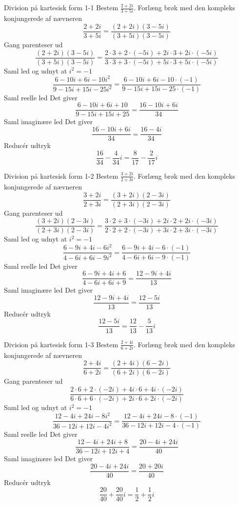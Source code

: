 \documentclass{article}
\begin{document}
\tableofcontents
\newpage
\begin{exercise}{Division på kartesisk form 1-1}
Bestem $\frac{2 + 2i}{3 + 5i}$.
\hint
Forlæng brøk med den kompleks konjungerede af nævneren
\[\frac{2 + 2i}{3 + 5i} = \frac{(2 + 2i)(3 - 5i)}{(3 + 5i)(3 - 5i)}
\]
\hint
Gang parenteser ud
\[\frac{(2 + 2i)(3 - 5i)}{(3 + 5i)(3 - 5i)} = \frac{2 \cdot 3 + 2\cdot (-5i) + 2i \cdot 3 + 2i \cdot (-5i)}{3 \cdot 3 + 3\cdot (-5i) + 5i \cdot 3 + 5i \cdot (-5i)}
\]
\hint
Saml led og udnyt at $i^2 = - 1$
\[\frac{6 - 10i + 6i - 10i^2}{9 - 15i + 15i - 25i^2} = \frac{6 - 10i + 6i - 10 \cdot (-1)}{9 - 15i + 15i - 25 \cdot (-1)}
\]
\hint
Saml reelle led
\hint
Det giver
\[\frac{6 - 10i + 6i + 10}{9 - 15i + 15i + 25} = \frac{16 - 10i + 6i}{34}
\]
\hint
Saml imaginære led
\hint
Det giver
\[\frac{16 - 10i + 6i}{34} = \frac{16 - 4i}{34}
\]
\hint
Reducér udtryk
\[\frac{16}{34} - \frac{4}{34}i = \frac{8}{17} - \frac{2}{17}i
\]
\end{exercise}
\newpage
\begin{exercise}{Division på kartesisk form 1-2}
Bestem $\frac{3 + 2i}{2 + 3i}$.
\hint
Forlæng brøk med den kompleks konjungerede af nævneren
\[\frac{3 + 2i}{2 + 3i} = \frac{(3 + 2i)(2 - 3i)}{(2 + 3i)(2 - 3i)}
\]
\hint
Gang parenteser ud
\[\frac{(3 + 2i)(2 - 3i)}{(2 + 3i)(2 - 3i)} = \frac{3 \cdot 2 + 3 \cdot (-3i) + 2i \cdot 2 + 2i \cdot (-3i)}{2 \cdot 2 + 2\cdot (-3i) + 3i \cdot 2 + 3i \cdot (-3i)}
\]
\hint
Saml led og udnyt at $i^2 = - 1$
\[\frac{6 - 9i + 4i - 6i^2}{4 - 6i + 6i - 9i^2} = \frac{6 - 9i + 4i - 6 \cdot (-1)}{4 - 6i + 6i - 9 \cdot (-1)}
\]
\hint
Saml reelle led
\hint
Det giver
\[\frac{6 - 9i + 4i + 6}{4 - 6i + 6i + 9} = \frac{12 - 9i + 4i}{13}
\]
\hint
Saml imaginære led
\hint
Det giver
\[\frac{12 - 9i + 4i}{13} = \frac{12 - 5i}{13}
\]
\hint
Reducér udtryk
\[\frac{12 - 5i}{13} = \frac{12}{13} - \frac{5}{13}i
\]
\end{exercise}
\newpage
\begin{exercise}{Division på kartesisk form 1-3}
Bestem $\frac{2 + 4i}{6 + 2i}$.
\hint
Forlæng brøk med den kompleks konjungerede af nævneren
\[\frac{2 + 4i}{6 + 2i} = \frac{(2 + 4i)(6 - 2i)}{(6 + 2i)(6 - 2i)}
\]
\hint
Gang parenteser ud
\[\frac{2 \cdot 6 + 2 \cdot (-2i) + 4i \cdot 6 + 4i \cdot (-2i)}{6 \cdot 6 + 6 \cdot (-2i) + 2i \cdot 6 + 2i \cdot (-2i)}
\]
\hint
Saml led og udnyt at $i^2 = - 1$
\[\frac{12 - 4i + 24i - 8i^2}{36 - 12i + 12i - 4i^2} = \frac{12 - 4i + 24i - 8 \cdot (-1)}{36 - 12i + 12i - 4 \cdot (-1)}
\]
\hint
Saml reelle led
\hint
Det giver
\[\frac{12 - 4i + 24i + 8}{36 - 12i + 12i + 4} = \frac{20 - 4i + 24i}{40}
\]
\hint
Saml imaginære led
\hint
Det giver
\[\frac{20 - 4i + 24i}{40} = \frac{20 + 20i}{40}
\]
\hint
Reducér udtryk
\[\frac{20}{40} + \frac{20}{40}i = \frac{1}{2} + \frac{1}{2}i
\]
\end{exercise}
\end{document}
